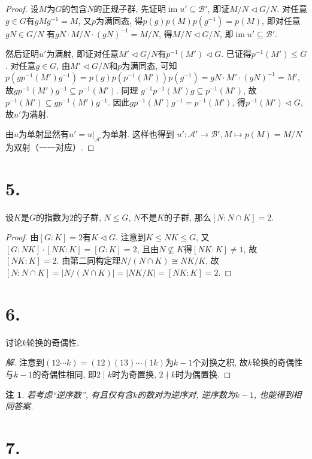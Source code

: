 \documentclass[12pt, a4paper, fontset=windows]{ctexart}
\newcommand{\abs}[1]{\left|{#1}\right|}
\newcommand{\im}{\operatorname{im}}
\newcommand{\isom}{\cong} %
\newcommand{\kh}[1]{（{#1}）} %
\newcommand{\yh}[1]{“{#1}”} %
\newtheorem*{remark}{注}
\newenvironment{solution}{\begin{proof}[解]}{\end{proof}}
\begin{document}
\begin{proof}
设$M$为$G$的包含$N$的正规子群, 先证明$\im u'\subseteq\mathcal{B}'$, 
即证$M/N\lhd G/N$. 对任意$g\in G$有$gMg^{-1}=M$, 
又$p$为满同态, 得$p(g)p(M)p(g^{-1})=p(M)$, 即对任意$gN\in G/N$
有$gN\cdot M/N\cdot(gN)^{-1}=M/N$, 
得$M/N\lhd G/N$, 即$\im u'\subseteq\mathcal{B}'$. 

然后证明$u'$为满射, 即证对任意$M'\lhd G/N$有$p^{-1}(M')\lhd G$. 
已证得$p^{-1}(M')\le G$. 对任意$g\in G$, 由$M'\lhd G/N$和$p$为满同态, 可知
$p(gp^{-1}(M')g^{-1})=p(g)p(p^{-1}(M'))p(g^{-1})=gN\cdot M'\cdot(gN)^{-1}=M'$, 
故$gp^{-1}(M')g^{-1}\subseteq p^{-1}(M')$. 同理
$g^{-1}p^{-1}(M')g\subseteq p^{-1}(M')$, 故$p^{-1}(M')\subseteq gp^{-1}(M')g^{-1}$. 
因此$gp^{-1}(M')g^{-1}=p^{-1}(M')$, 得$p^{-1}(M')\lhd G$, 故$u'$为满射. 

由$u$为单射显然有$u'=u|_{\mathcal{A}'}$为单射. 这样也得到
$u':\mathcal{A}'\to\mathcal{B}',M\mapsto p(M)=M/N$为双射\kh{一一对应}. 
\end{proof}

\section*{5.}

设$K$是$G$的指数为$2$的子群, $N\le G$, $N$不是$K$的子群, 
那么$[N:N\cap K]=2$. 

\begin{proof}
由$[G:K]=2$有$K\lhd G$. 
注意到$K\le NK\le G$, 又$[G:NK]\cdot[NK:K]=[G:K]=2$, 
且由$N\not\subseteq K$得$[NK:K]\ne 1$, 故$[NK:K]=2$. 
由第二同构定理$N/(N\cap K)\isom NK/K$, 故
$[N:N\cap K]=\abs{N/(N\cap K)}=\abs{NK/K}=[NK:K]=2$. 
\end{proof}

\section*{6.}

讨论$k$轮换的奇偶性. 

\begin{solution}
注意到$(12\cdots k)=(12)(13)\cdots(1k)$为$k-1$个对换之积, 
故$k$轮换的奇偶性与$k-1$的奇偶性相同, 即$2\mid k$时为奇置换, 
$2\nmid k$时为偶置换. 
\end{solution}

\begin{remark}
若考虑\yh{逆序数}, 有且仅有含$k$的数对为逆序对, 
逆序数为$k-1$, 也能得到相同答案. 
\end{remark}

\section*{7.}
\label{perm-conj}
\end{document}
